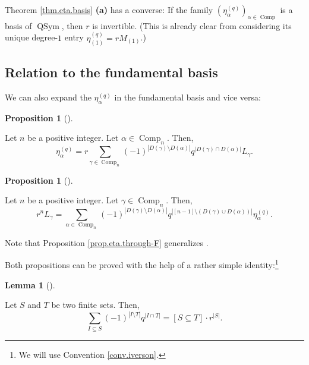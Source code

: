 \documentclass[numbers=enddot,12pt,final,onecolumn,notitlepage]{scrartcl}%
\theoremstyle{definition}
\newtheorem{lem}[theo]{Lemma}
\newenvironment{lemma}[1][]
{\begin{lem}[#1]\begin{leftbar}}
{\end{leftbar}\end{lem}}
\newtheorem{prop}[theo]{Proposition}
\newenvironment{proposition}[1][]
{\begin{prop}[#1]\begin{leftbar}}
{\end{leftbar}\end{prop}}
\let\sumnonlimits\sum
\renewcommand{\sum}{\sumnonlimits\limits}
\begin{document}
Theorem \ref{thm.eta.basis} \textbf{(a)} has a converse: If the family
$\left(  \eta_{\alpha}^{\left(  q\right)  }\right)  _{\alpha\in
\operatorname*{Comp}}$ is a basis of $\operatorname*{QSym}$, then $r$ is
invertible. (This is already clear from considering its unique degree-$1$
entry $\eta_{\left(  1\right)  }^{\left(  q\right)  }=rM_{\left(  1\right)  }$.)

\subsection{Relation to the fundamental basis}

We can also expand the $\eta_{\alpha}^{\left(  q\right)  }$ in the fundamental
basis and vice versa:

\begin{proposition}
\label{prop.eta.through-F}Let $n$ be a positive integer. Let $\alpha
\in\operatorname*{Comp}\nolimits_{n}$. Then,%
\[
\eta_{\alpha}^{\left(  q\right)  }=r\sum_{\gamma\in\operatorname*{Comp}%
\nolimits_{n}}\left(  -1\right)  ^{\left\vert D\left(  \gamma\right)
\setminus D\left(  \alpha\right)  \right\vert }q^{\left\vert D\left(
\gamma\right)  \cap D\left(  \alpha\right)  \right\vert }L_{\gamma}.
\]

\end{proposition}

\begin{proposition}
\label{prop.eta.F-through}Let $n$ be a positive integer. Let $\gamma
\in\operatorname*{Comp}\nolimits_{n}$. Then,%
\[
r^{n}L_{\gamma}=\sum_{\alpha\in\operatorname*{Comp}\nolimits_{n}}\left(
-1\right)  ^{\left\vert D\left(  \gamma\right)  \setminus D\left(
\alpha\right)  \right\vert }q^{\left\vert \left[  n-1\right]  \setminus\left(
D\left(  \gamma\right)  \cup D\left(  \alpha\right)  \right)  \right\vert
}\eta_{\alpha}^{\left(  q\right)  }.
\]

\end{proposition}

Note that Proposition \ref{prop.eta.through-F} generalizes \cite[Proposition
2.2]{Hsiao07}.

Both propositions can be proved with the help of a rather simple
identity:\footnote{We will use Convention \ref{conv.iverson}.}

\begin{lemma}
\label{lem.eta.through-F.lem1}Let $S$ and $T$ be two finite sets. Then,%
\[
\sum_{I\subseteq S}\left(  -1\right)  ^{\left\vert I\setminus T\right\vert
}q^{\left\vert I\cap T\right\vert }=\left[  S\subseteq T\right]  \cdot
r^{\left\vert S\right\vert }.
\]

\end{lemma}
\end{document}
